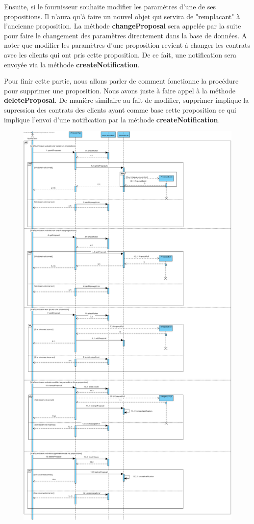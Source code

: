 \begin{flushleft}
Ensuite, si le fournisseur souhaite modifier les paramètres d'une de ses propositions. Il n'aura qu'à faire un nouvel objet qui servira de "remplacant" à l'ancienne proposition. La méthode \textbf{changeProposal} sera appelée par la suite pour faire le changement des paramètres directement dans la base de données. A noter que modifier les paramètres d'une proposition revient à changer les contrats avec les clients qui ont pris cette proposition. De ce fait, une notification sera envoyée via la méthode \textbf{createNotification}.
\end{flushleft}

\begin{flushleft}
Pour finir cette partie, nous allons parler de comment fonctionne la procédure pour supprimer une proposition. Nous avons juste à faire appel à la méthode \textbf{deleteProposal}. De manière similaire au fait de modifier, supprimer implique la supression des contrats des clients ayant comme base cette proposition ce qui implique l'envoi d'une notification par la méthode \textbf{createNotification}.
\end{flushleft}

\newpage
\begin{figure}[h]
    \centering
    \includegraphics[height = 0.9\textwidth]{Base/sequence/img/fournisseur/voir les propositions.png}
\end{figure}

